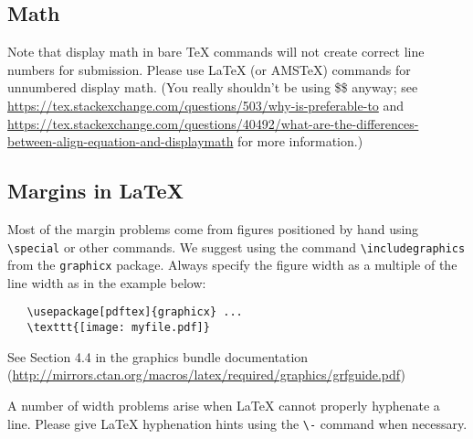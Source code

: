 \documentclass{article}
\begin{document}
\subsection{Math}

Note that display math in bare TeX commands will not create correct line numbers for submission. Please use LaTeX (or AMSTeX) commands for unnumbered display math. (You really shouldn't be using \$\$ anyway; see \url{https://tex.stackexchange.com/questions/503/why-is-preferable-to} and \url{https://tex.stackexchange.com/questions/40492/what-are-the-differences-between-align-equation-and-displaymath} for more information.)

\subsection{Margins in \LaTeX{}}

Most of the margin problems come from figures positioned by hand using
\verb+\special+ or other commands. We suggest using the command
\verb+\includegraphics+ from the \verb+graphicx+ package. Always specify the
figure width as a multiple of the line width as in the example below:
\begin{verbatim}
   \usepackage[pdftex]{graphicx} ...
   \texttt{[image: myfile.pdf]}
\end{verbatim}
See Section 4.4 in the graphics bundle documentation
(\url{http://mirrors.ctan.org/macros/latex/required/graphics/grfguide.pdf})

A number of width problems arise when \LaTeX{} cannot properly hyphenate a
line. Please give LaTeX hyphenation hints using the \verb+\-+ command when
necessary.





\end{document}
